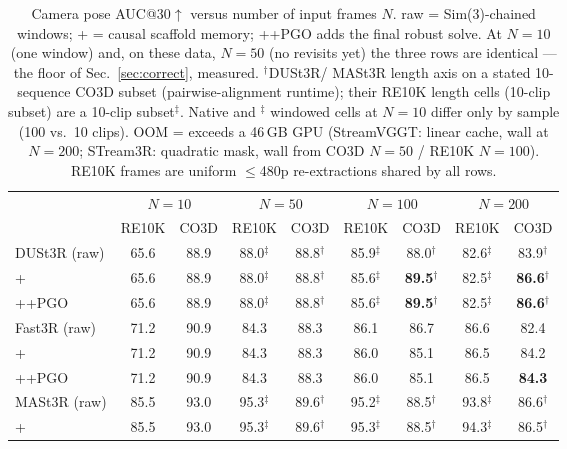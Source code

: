 \begin{table}[t]
\centering\scriptsize
\setlength{\tabcolsep}{3.0pt}
\caption{Camera pose AUC@30$\uparrow$ versus number of input frames
$N$. raw = Sim(3)-chained windows; +\smr{} = causal scaffold memory;
+\smr{}+PGO adds the final robust solve. At $N{=}10$ (one window) and,
on these data, $N{=}50$ (no revisits yet) the three rows are identical
--- the floor of Sec.~\ref{sec:correct}, measured. $^{\dagger}$DUSt3R/
MASt3R length axis on a stated 10-sequence CO3D subset
(pairwise-alignment runtime); their RE10K length cells (10-clip subset)
are a 10-clip subset$^{\ddagger}$. Native and $^{\ddagger}$ windowed cells at $N{=}10$ differ only by sample (100 vs.\ 10 clips). OOM = exceeds a 46\,GB GPU (StreamVGGT: linear cache, wall at $N{=}200$; STream3R: quadratic mask, wall from CO3D $N{=}50$ / RE10K $N{=}100$). RE10K frames are uniform $\le$480p re-extractions shared by all rows.}
\label{tab:pose}
\begin{tabular}{@{}l cc cc cc cc@{}}
\toprule
& \multicolumn{2}{c}{$N{=}10$} & \multicolumn{2}{c}{$N{=}50$}
& \multicolumn{2}{c}{$N{=}100$} & \multicolumn{2}{c}{$N{=}200$} \\
\cmidrule(lr){2-3}\cmidrule(lr){4-5}\cmidrule(lr){6-7}\cmidrule(lr){8-9}
 & RE10K & CO3D & RE10K & CO3D & RE10K & CO3D & RE10K & CO3D \\
\midrule
DUSt3R (raw) & 65.6 & 88.9 & 88.0$^{\ddagger}$ & 88.8$^{\dagger}$ & 85.9$^{\ddagger}$ & 88.0$^{\dagger}$ & 82.6$^{\ddagger}$ & 83.9$^{\dagger}$ \\
\;+\smr{} & 65.6 & 88.9 & 88.0$^{\ddagger}$ & 88.8$^{\dagger}$ & 85.6$^{\ddagger}$ & \textbf{89.5}$^{\dagger}$ & 82.5$^{\ddagger}$ & \textbf{86.6}$^{\dagger}$ \\
\;+\smr{}+PGO & 65.6 & 88.9 & 88.0$^{\ddagger}$ & 88.8$^{\dagger}$ & 85.6$^{\ddagger}$ & \textbf{89.5}$^{\dagger}$ & 82.5$^{\ddagger}$ & \textbf{86.6}$^{\dagger}$ \\
\midrule
Fast3R (raw) & 71.2 & 90.9 & 84.3 & 88.3 & 86.1 & 86.7 & 86.6 & 82.4 \\
\;+\smr{} & 71.2 & 90.9 & 84.3 & 88.3 & 86.0 & 85.1 & 86.5 & 84.2 \\
\;+\smr{}+PGO & 71.2 & 90.9 & 84.3 & 88.3 & 86.0 & 85.1 & 86.5 & \textbf{84.3} \\
\midrule
MASt3R (raw) & 85.5 & 93.0 & 95.3$^{\ddagger}$ & 89.6$^{\dagger}$ & 95.2$^{\ddagger}$ & 88.5$^{\dagger}$ & 93.8$^{\ddagger}$ & 86.6$^{\dagger}$ \\
\;+\smr{} & 85.5 & 93.0 & 95.3$^{\ddagger}$ & 89.6$^{\dagger}$ & 95.3$^{\ddagger}$ & 88.5$^{\dagger}$ & 94.3$^{\ddagger}$ & 86.5$^{\dagger}$ \\

\end{tabular}
\end{table}
